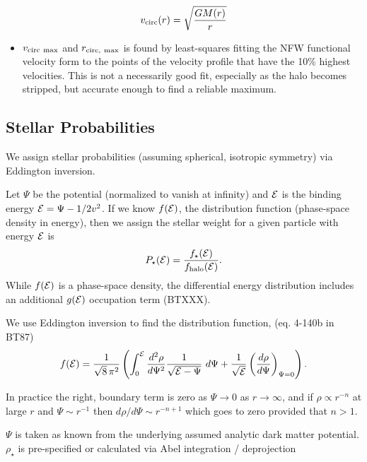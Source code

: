 \begin{equation}
v_{\rm circ}(r) = \sqrt{\frac{GM(r)}{r}}
\end{equation}

\begin{itemize}
\tightlist
\item
  \(v_{\rm circ\ max}\) and \(r_{\rm circ,\ max}\) is found by
  least-squares fitting the NFW functional velocity form to the points
  of the velocity profile that have the 10\% highest velocities. This is
  not a necessarily good fit, especially as the halo becomes stripped,
  but accurate enough to find a reliable maximum.
\end{itemize}

\subsection{Stellar Probabilities}\label{stellar-probabilities}

We assign stellar probabilities (assuming spherical, isotropic symmetry)
via Eddington inversion.

Let \(\Psi\) be the potential (normalized to vanish at infinity) and
\({\cal E}\) is the binding energy \({\cal E} = \Psi - 1/2 v^2\). If we
know \(f({\cal E})\), the distribution function (phase-space density in
energy), then we assign the stellar weight for a given particle with
energy \({\cal E}\) is \begin{equation}
P_\star({\cal E}) = \frac{f_\star({\cal E})}{f_{\rm halo}({\cal E})}.
\end{equation} While \(f({\cal E})\) is a phase-space density, the
differential energy distribution includes an additional \(g({\cal E})\)
occupation term (BTXXX).

We use Eddington inversion to find the distribution function, (eq.
4-140b in BT87) \begin{equation}
f({\cal E}) = \frac{1}{\sqrt{8}\, \pi^2}\left( \int_0^{\cal E} \frac{d^2\rho}{d\Psi^2} \frac{1}{\sqrt{{\cal E} - \Psi}}\ d\Psi + \frac{1}{\sqrt{\cal E}} \left(\frac{d\rho}{d\Psi}\right)_{\Psi=0} \right).
\end{equation}

In practice the right, boundary term is zero as \(\Psi \to 0\) as
\(r\to\infty\), and if \(\rho \propto r^{-n}\) at large \(r\) and
\(\Psi \sim r^{-1}\) then \(d\rho / d\Psi \sim r^{-n+1}\) which goes to
zero provided that \(n > 1\).

\(\Psi\) is taken as known from the underlying assumed analytic dark
matter potential. \(\rho_\star\) is pre-specified or calculated via Abel
integration / deprojection

